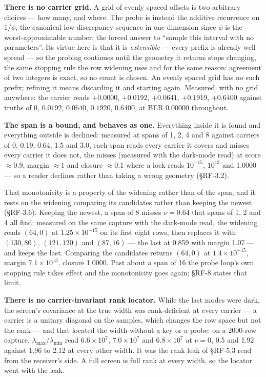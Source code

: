 \documentclass[10pt,letterpaper,twocolumn]{article}
\begin{document}
\textbf{There is no carrier grid.} A grid of evenly spaced offsets is two arbitrary choices --- how many, and where. The probe is instead the additive recurrence on \(1/\phi\), the canonical low-discrepancy sequence in one dimension since \(\phi\) is the worst-approximable number: the forced answer to ``sample this interval with no parameters''. Its virtue here is that it is \emph{extensible} --- every prefix is already well spread --- so the probing continues until the geometry it returns stops changing, the same stopping rule the row widening uses and for the same reason: agreement of two integers is exact, so no count is chosen. An evenly spaced grid has no such prefix; refining it means discarding it and starting again. Measured, with no grid anywhere: the carrier reads \(+0.0000\), \(+0.0192\), \(+0.0641\), \(+0.1919\), \(+0.6400\) against truths of \(0\), \(0.0192\), \(0.0640\), \(0.1920\), \(0.6400\), at BER 0.00000 throughout.

\textbf{The span is a bound, and behaves as one.} Everything inside it is found and everything outside is declined: measured at spans of 1, 2, 4 and 8 against carriers of 0, 0.19, 0.64, 1.5 and 3.0, each span reads every carrier it covers and misses every carrier it does not, the misses (measured with the dark-mode read) at score \(\approx 0.9\), margin \(\approx 1\) and closure \(\approx 0.1\) where a lock reads \(10^{-15}\), \(10^{13}\) and 1.0000 --- so a reader declines rather than taking a wrong geometry (§RF-3.2).

That monotonicity is a property of the widening rather than of the span, and it rests on the widening comparing its candidates rather than keeping the newest (§RF-3.6). Keeping the newest, a span of 8 misses \(\nu = 0.64\) that spans of 1, 2 and 4 all find: measured on the same capture with the dark-mode read, the widening reads \((64, 0)\) at \(1.25\times10^{-15}\) on its first eight rows, then replaces it with \((130, 80)\), \((121, 120)\) and \((87, 16)\) --- the last at 0.859 with margin 1.07 --- and keeps the last. Comparing the candidates returns \((64, 0)\) at \(1.4\times10^{-15}\), margin \(7.1\times10^{13}\), closure 1.0000. Past about a span of 16 the probe loop's own stopping rule takes effect and the monotonicity goes again; §RF-8 states that limit.

\textbf{There is no carrier-invariant rank locator.} While the last modes were dark, the screen's covariance at the true width was rank-deficient at every carrier --- a carrier is a unitary diagonal on the samples, which changes the row space but not the rank --- and that located the width without a key or a probe: on a 2000-row capture, \(\lambda_{\max}/\lambda_{\min}\) read \(6.6\times10^{7}\), \(7.0\times10^{7}\) and \(6.8\times10^{7}\) at \(\nu = 0\), 0.5 and 1.92 against 1.96 to 2.12 at every other width. It was the rank leak of §RF-5.3 read from the receiver's side. A full screen is full rank at every width, so the locator went with the leak.
\end{document}
